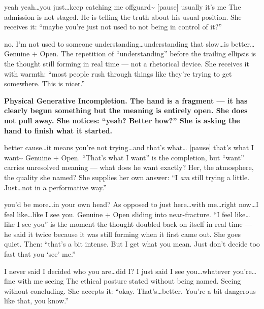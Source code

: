 {yeah yeah\ldots you just\ldots keep catching me offguard\textasciitilde} {[pause]} {usually it's me}
{The admission is not staged. He is telling the truth about his usual position. She receives it: ``maybe you're just not used to not being in control of it?''}

\thinrule

{no. I'm not used to someone understanding\ldots understanding that slow\ldots is better\ldots}
{Genuine + Open. The repetition of ``understanding'' before the trailing ellipsis is the thought still forming in real time --- not a rhetorical device. She receives it with warmth: ``most people rush through things like they're trying to get somewhere. This is nicer.''}

{}
{\textbf{Physical Generative Incompletion. The hand is a fragment --- it has clearly begun something but the meaning is entirely open. She does not pull away. She notices: ``yeah? Better how?'' She is asking the hand to finish what it started.}}

{better cause\ldots it means you're not trying\ldots and that's what\ldots} {[pause]} {that's what I want\textasciitilde}
{Genuine + Open. ``That's what I want'' is the completion, but ``want'' carries unresolved meaning --- what does he want exactly? Her, the atmosphere, the quality she named? She supplies her own answer: ``I \textit{am} still trying a little. Just\ldots not in a performative way.''}

\thinrule

{you'd be more\ldots in your own head? As opposed to just here\ldots with me\ldots right now\ldots I feel like\ldots like I see you.}
{Genuine + Open sliding into near-fracture. ``I feel like\ldots like I see you'' is the moment the thought doubled back on itself in real time --- he said it twice because it was still forming when it first came out. She goes quiet. Then: ``that's a bit intense. But I get what you mean. Just don't decide too fast that you `see' me.''}

{I never said I decided who you are\ldots did I? I just said I see you\ldots whatever you're\ldots fine with me seeing}
{The ethical posture stated without being named. Seeing without concluding. She accepts it: ``okay. That's\ldots better. You're a bit dangerous like that, you know.''}

